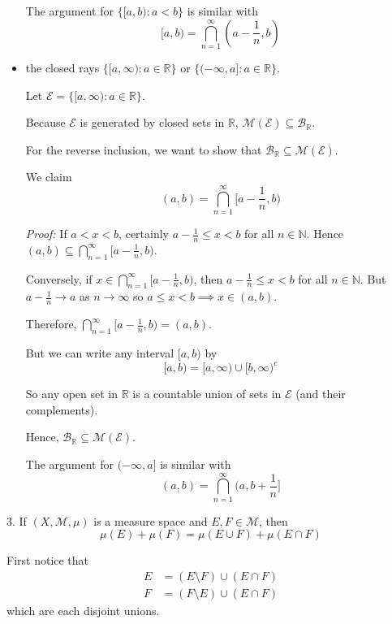 \documentclass[12pt]{article}
\newcommand{\R}{\mathbb{R}}
\newcommand{\N}{\mathbb{N}}
\newcommand{\Ec}{\mathcal{E}}
\newcommand{\sub}{\subseteq}
\newcommand{\B}{\mathcal{B}}
\newcommand{\M}{\mathcal{M}}
\newenvironment*{proof}[1][blue]{
        \begin{tcolorbox}[
            parbox=false,
            colback=#1!5!white,
            colframe=#1!75!black,
            coltext=#1,
            breakable
        ]}
        {\end{tcolorbox}}
\begin{document}
\begin{itemize}
            The argument for $\{[a, b): a < b\}$ is similar with 
            \[[a, b) = \bigcap_{n=1}^{\infty} (a - \frac{1}{n}, b)\]

        \color{black}

    \item the closed rays $\{[a,\infty): a \in \R\}$ or $\{(-\infty, a]: a \in \R\}$.
    
    \color{blue}
        Let $\Ec = \{[a, \infty): a \in \R\}$.
        
        Because $\Ec$ is generated by closed sets in $\R$, $\M(\Ec) \sub \B_{\R}$. 

        For the reverse inclusion, we want to show that $\B_{\R} \sub \M(\Ec)$.

        We claim 
        \[(a, b) = \bigcap_{n=1}^{\infty} [a - \frac{1}{n}, b)\]

        \begin{proof}
            \emph{Proof:} 
            If $a < x < b$, certainly $a - \frac{1}{n} \leq x < b$ for all $n \in \N$. Hence $(a, b) \sub \bigcap_{n=1}^{\infty} [a - \frac{1}{n}, b)$.

            Conversely, if $x \in \bigcap_{n=1}^{\infty} [a - \frac{1}{n}, b)$, then $a - \frac{1}{n} \leq x < b$ for all $n \in \N$. But $a - \frac{1}{n} \to a$ as $n \to \infty$ so $a \leq x < b \implies x \in (a, b)$.

            Therefore, $\bigcap_{n=1}^{\infty} [a - \frac{1}{n}, b) = (a, b)$.
        \end{proof}

        But we can write any interval $[a, b)$ by 
        \[[a, b) = [a, \infty) \cup [b, \infty)^c\]

        So any open set in $\R$ is a countable union of sets in $\Ec$ (and their complements). 

        Hence, $\B_{\R} \sub \M(\Ec)$.

        The argument for $(-\infty, a]$ is similar with 
        \[(a, b) = \bigcap_{n=1}^{\infty} (a, b + \frac{1}{n}]\]
            
    \color{black}

\end{itemize}

\pagebreak 

3. If $(X, \M, \mu)$ is a measure space and $E, F \in \M$, then 
\[\mu(E) + \mu(F) = \mu(E \cup F) + \mu(E \cap F)\]

    \color{blue}
        First notice that 
        \begin{align*}
            E &= (E \setminus F) \cup (E \cap F)\\
            F &= (F \setminus E) \cup (E \cap F)
        \end{align*}
        which are each disjoint unions.
\end{document}
